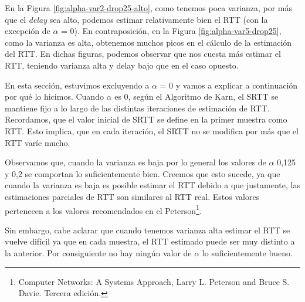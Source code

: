 En la Figura \ref{fig:alpha-var2-drop25-alto}, como tenemos poca varianza, por más que el \emph{delay} sea alto, podemos estimar relativamente bien el RTT (con la excepción de $\alpha$ = 0). En contraposición, en la Figura \ref{fig:alpha-var5-drop25}, como la varianza es alta, obtenemos  muchos picos en el cálculo de la estimación del RTT. En dichas figuras, podemos observar que nos cuesta más estimar el RTT, teniendo varianza alta y delay bajo que en el caso opuesto.

En esta sección, estuvimos excluyendo a $\alpha$ = 0 y vamos a explicar a continuación por qué lo hicimos. Cuando $\alpha$ es 0, según el Algoritmo de Karn, el SRTT se mantiene fijo a lo largo de las distintas iteraciones de estimación de RTT. Recordamos, que el valor inicial de SRTT se define en la primer muestra como RTT. Esto implica, que en cada iteración, el SRTT no se modifica por más que el RTT varíe mucho.

Observamos que, cuando la varianza es baja por lo general los valores de $\alpha$ 0,125 y 0,2 se comportan lo suficientemente bien. Creemos que esto sucede, ya que cuando la varianza es baja es posible estimar el RTT debido a que justamente, las estimaciones parciales de RTT son similares al RTT real. Estos valores pertenecen a los valores recomendados en el Peterson\footnote{Computer Networks: A Systems Approach, Larry L. Peterson and Bruce S. Davie. Tercera edición.}.

Sin embargo, cabe aclarar que cuando tenemos varianza alta estimar el RTT se vuelve difícil ya que en cada muestra, el RTT estimado puede ser muy distinto a la anterior. Por consiguiente no hay ningún valor de $\alpha$ lo suficientemente bueno.

